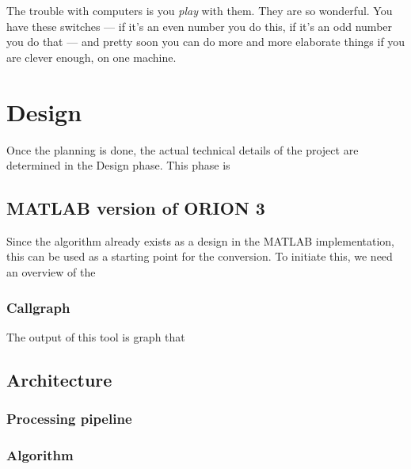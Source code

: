 \begin{savequote}[0.55\linewidth]
	\begin{fancyquote}
		The trouble with computers is you \emph{play} with them. They are so
		wonderful. You have these switches --- if it's an even number you do
		this, if it's an odd number you do that --- and pretty soon you can
		do more and more elaborate things if you are clever enough, on one
		machine.
	\end{fancyquote}
\end{savequote}
\chapter{Design}\label{ch:design}

Once the planning is done, the actual technical details of the
project are determined in the Design phase. This phase is 


\section{MATLAB version of ORION 3}

Since the algorithm already exists as a design in the MATLAB
implementation, this can be used as a starting point for the
conversion. To initiate this, we need an overview of the 

\subsection{Callgraph}

The output of this tool is graph that %



\section{Architecture}

\subsection{Processing pipeline}

\subsection{Algorithm}



